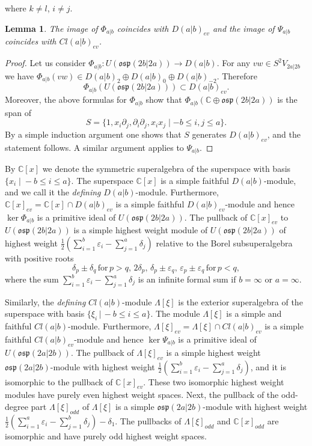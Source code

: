 \documentclass[12pt]{amsart}
\theoremstyle{plain} %
\numberwithin{equation}{section}
\theoremstyle{definition}
\theoremstyle{remark}
\theoremstyle{plain} %
\newtheorem{lemma}[definition]{Lemma}
\newcommand{\osp}{\mathfrak{osp}}
\newcommand{\C}{\mathbb{C}}
\begin{document}
\noindent  where $k\neq l$, $i \neq j$. 

\begin{lemma}\label{homomorphisms_Lie} The image of $\Phi_{a|b}$ coincides with $D(a|b)_{ev}$ and the image of $\Psi_{a|b}$ coincides with $Cl(a|b)_{ev}$.
  \end{lemma}
  \begin{proof} Let us consider $\Phi_{a|b}:U(\osp(2b|2a))\to D(a|b)$. For any $vw\in S^2 V_{2a|2b} $ we have $\Phi_{a|b}(vw)\in D(a|b)_2\oplus D(a|b)_0\oplus D(a|b)_{-2}$. Therefore
      $$\Phi_{a|b}(U(\osp(2b|2a)))\subset D(a|b)_{ev}.$$
      Moreover, the above formulas for  $\Phi_{a|b}$ show that $\Phi_{a|b}(\mathbb C\oplus \osp(2b|2a))$ is the span of $$S=\{1,x_i\partial_j,\partial_i\partial_j,x_ix_j\mid -b \leq i,j \leq a\}.$$ By a simple induction argument one  shows that $S$ generates $D(a|b)_{ev}$, and the statement follows. A similar argument applies  to $\Psi_{a|b}$. 
    \end{proof}

By $\C [x]$ we denote the symmetric superalgebra of the superspace with basis\\ $\{ x_i \; | \;  -b \leq i \leq a \} $.  The superspace  $\C [x]$   is  a simple faithful $D(a|b)$-module, and we call it the  \emph{defining} $D(a|b)$-module.  Furthermore, $\mathbb C[x]_{ev} = \mathbb C[x] \cap D(a|b)_{ev}$ is a simple faithful $D(a|b)_{ev}$-module and hence $\ker \Phi_{a|b}$ is a primitive ideal of $U(\osp(2b|2a))$. The pullback of $\mathbb{C}[x]_{ev}$ to
    $U(\osp(2b | 2a))$ is a simple highest weight module of $U(\osp(2b | 2a))$ of highest weight $\frac{1}{2}\left( \sum_{i=1}^b \varepsilon_i - \sum_{j=1}^a \delta_j \right)$ relative to the Borel subsuperalgebra with positive roots 
    $$\delta_p\pm\delta_q\,\text{for}\,p>q,\,2\delta_{p},\,\delta_p\pm\varepsilon_q,\,\varepsilon_p\pm\varepsilon_q\,\text{for}\,p<q,$$
where the sum $\sum_{i=1}^b \varepsilon_i-\sum_{j=1}^a \delta_j$ is an infinite formal sum if $b=\infty$ or $a=\infty$. 
  

    
    Similarly, the \emph{defining} $Cl(a|b)$-module $\Lambda[\xi]$ is the exterior superalgebra of the superspace with basis $\{ \xi_i \, | \, -b\leq i \leq a \}$. The module $\Lambda[\xi]$ is a  simple and faithful  $Cl(a|b)$-module. Furthermore, $\Lambda[\xi]_{ev} = \Lambda[\xi] \cap Cl(a|b)_{ev}$ is a simple faithful $Cl(a|b)_{ev}$-module and hence 
     $\ker \Psi_{a|b}$ is a primitive ideal of $U(\osp(2a|2b))$. The pullback of $\Lambda [\xi]_{ev}$ is a simple highest weight $\osp(2a|2b)$-module with highest weight $\frac{1}{2}\left( \sum_{i=1}^b \varepsilon_i - \sum_{j=1}^a \delta_j \right)$, and it is isomorphic  to the pullback of $\mathbb{C}[x]_{ev}$.    These two  isomorphic highest weight modules have purely even highest weight spaces. Next, the pullback of the odd-degree part $\Lambda [\xi]_{odd}$ of  $\Lambda [\xi]$ is a simple $\osp(2a|2b)$-module  with highest weight $\frac{1}{2}\left( \sum_{i=1}^a \varepsilon_i - \sum_{j=1}^b \delta_j \right) - \delta_1$. The pullbacks of $\Lambda [\xi]_{odd}$ and $\mathbb{C}[x]_{odd}$ are isomorphic and have purely odd  highest weight  spaces.
\end{document}
